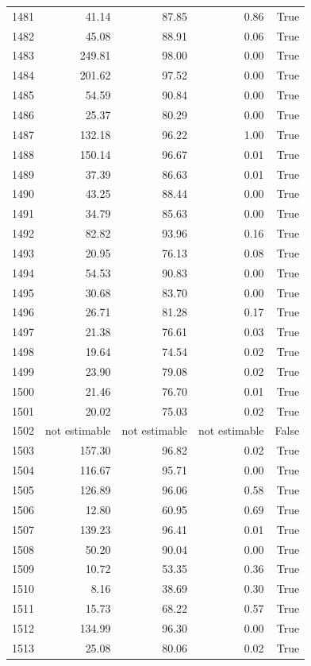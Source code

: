 \begin{longtable}{rrrrr}
1481 & 41.14 & 87.85 & 0.86 & True \\
1482 & 45.08 & 88.91 & 0.06 & True \\
1483 & 249.81 & 98.00 & 0.00 & True \\
1484 & 201.62 & 97.52 & 0.00 & True \\
1485 & 54.59 & 90.84 & 0.00 & True \\
1486 & 25.37 & 80.29 & 0.00 & True \\
1487 & 132.18 & 96.22 & 1.00 & True \\
1488 & 150.14 & 96.67 & 0.01 & True \\
1489 & 37.39 & 86.63 & 0.01 & True \\
1490 & 43.25 & 88.44 & 0.00 & True \\
1491 & 34.79 & 85.63 & 0.00 & True \\
1492 & 82.82 & 93.96 & 0.16 & True \\
1493 & 20.95 & 76.13 & 0.08 & True \\
1494 & 54.53 & 90.83 & 0.00 & True \\
1495 & 30.68 & 83.70 & 0.00 & True \\
1496 & 26.71 & 81.28 & 0.17 & True \\
1497 & 21.38 & 76.61 & 0.03 & True \\
1498 & 19.64 & 74.54 & 0.02 & True \\
1499 & 23.90 & 79.08 & 0.02 & True \\
1500 & 21.46 & 76.70 & 0.01 & True \\
1501 & 20.02 & 75.03 & 0.02 & True \\
1502 & not estimable & not estimable & not estimable & False \\
1503 & 157.30 & 96.82 & 0.02 & True \\
1504 & 116.67 & 95.71 & 0.00 & True \\
1505 & 126.89 & 96.06 & 0.58 & True \\
1506 & 12.80 & 60.95 & 0.69 & True \\
1507 & 139.23 & 96.41 & 0.01 & True \\
1508 & 50.20 & 90.04 & 0.00 & True \\
1509 & 10.72 & 53.35 & 0.36 & True \\
1510 & 8.16 & 38.69 & 0.30 & True \\
1511 & 15.73 & 68.22 & 0.57 & True \\
1512 & 134.99 & 96.30 & 0.00 & True \\
1513 & 25.08 & 80.06 & 0.02 & True \\

\end{longtable}
